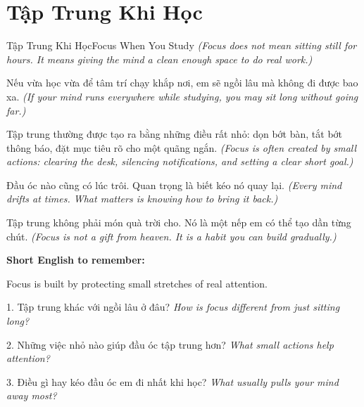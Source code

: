 \section{Tập Trung Khi Học}
\begin{truyen}{Tập Trung Khi Học}{Focus When You Study}
\textit{(Focus does not mean sitting still for hours. It means giving the mind a clean enough space to do real work.)}

Nếu vừa học vừa để tâm trí chạy khắp nơi, em sẽ ngồi lâu mà không đi được bao xa.
\textit{(If your mind runs everywhere while studying, you may sit long without going far.)}

Tập trung thường được tạo ra bằng những điều rất nhỏ: dọn bớt bàn, tắt bớt thông báo, đặt mục tiêu rõ cho một quãng ngắn.
\textit{(Focus is often created by small actions: clearing the desk, silencing notifications, and setting a clear short goal.)}

Đầu óc nào cũng có lúc trôi. Quan trọng là biết kéo nó quay lại.
\textit{(Every mind drifts at times. What matters is knowing how to bring it back.)}
\end{truyen}

\begin{baihoc}
Tập trung không phải món quà trời cho. Nó là một nếp em có thể tạo dần từng chút.
\textit{(Focus is not a gift from heaven. It is a habit you can build gradually.)}
\end{baihoc}

\begin{ghinhoanh}
\textbf{Short English to remember:}

Focus is built by protecting small stretches of real attention.

\end{ghinhoanh}

\begin{tuhocnhanh}
1. Tập trung khác với ngồi lâu ở đâu? \textit{How is focus different from just sitting long?}

2. Những việc nhỏ nào giúp đầu óc tập trung hơn? \textit{What small actions help attention?}

3. Điều gì hay kéo đầu óc em đi nhất khi học? \textit{What usually pulls your mind away most?}
\end{tuhocnhanh}
\ngancach


